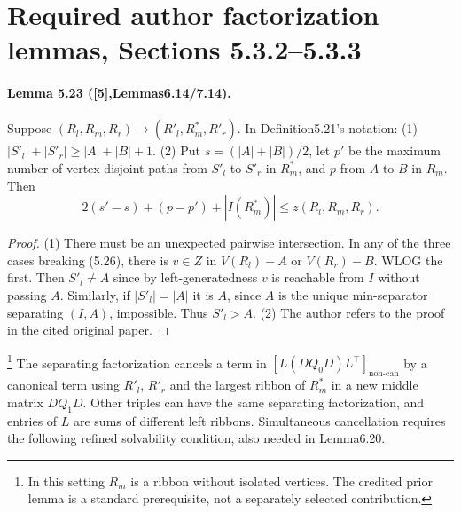 \documentclass[10pt,a4paper]{article}
\begin{document}
\section*{Required author factorization lemmas, Sections 5.3.2--5.3.3}
\paragraph{Lemma 5.23 ([5],Lemmas6.14/7.14).} Suppose $(R_l,R_m,R_r)\to(R'_l,R^*_m,R'_r)$. In Definition5.21's notation: (1) $|S'_l|+|S'_r|\ge|A|+|B|+1$. (2) Put $s=(|A|+|B|)/2$, let $p'$ be the maximum number of vertex-disjoint paths from $S'_l$ to $S'_r$ in $R^*_m$, and $p$ from $A$ to $B$ in $R_m$. Then
\[2(s'-s)+(p-p')+|I(R^*_m)|\le z(R_l,R_m,R_r).\]
\begin{proof}(1) There must be an unexpected pairwise intersection. In any of the three cases breaking (5.26), there is $v\in Z$ in $V(R_l)-A$ or $V(R_r)-B$. WLOG the first. Then $S'_l\ne A$ since by left-generatedness $v$ is reachable from $I$ without passing $A$. Similarly, if $|S'_l|=|A|$ it is $A$, since $A$ is the unique min-separator separating $(I,A)$, impossible. Thus $S'_l>A$. (2) The author refers to the proof in the cited original paper.\end{proof}
\footnote{In this setting $R_m$ is a ribbon without isolated vertices. The credited prior lemma is a standard prerequisite, not a separately selected contribution.}
The separating factorization cancels a term in $[L(DQ_0D)L^\top]_{\mathrm{non\text{-}can}}$ by a canonical term using $R'_l$, $R'_r$ and the largest ribbon of $R^*_m$ in a new middle matrix $DQ_1D$. Other triples can have the same separating factorization, and entries of $L$ are sums of different left ribbons. Simultaneous cancellation requires the following refined solvability condition, also needed in Lemma6.20.
\end{document}
